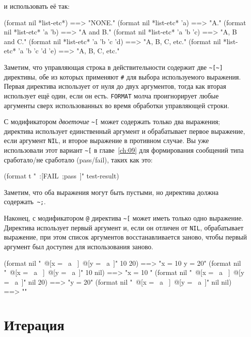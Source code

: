 \noindent{}и использовать её так:

\begin{myverb}
(format nil *list-etc*)                ==> "NONE."
(format nil *list-etc* 'a)             ==> "A."
(format nil *list-etc* 'a 'b)          ==> "A and B."
(format nil *list-etc* 'a 'b 'c)       ==> "A, B and C."
(format nil *list-etc* 'a 'b 'c 'd)    ==> "A, B, C, etc."
(format nil *list-etc* 'a 'b 'c 'd 'e) ==> "A, B, C, etc."
\end{myverb}

Заметим, что управляющая строка в действительности содержит две \lstinline!~[~]!
директивы, обе из которых применяют \lstinline!#! для выбора используемого
выражения. Первая директива использует от нуля до двух аргументов, тогда как вторая
использует ещё один, если он есть. \lstinline{FORMAT} молча проигнорирует любые аргументы
сверх использованных во время обработки управляющей строки.

С модификатором \textit{двоеточие} \lstinline!~[! может содержать только два выражения;
директива использует единственный аргумент и обрабатывает первое выражение, если аргумент
\lstinline{NIL}, и второе выражение в противном случае. Вы уже использовали этот вариант
\lstinline!~[! в главе~\ref{ch:09} для формирования сообщений типа сработало/не сработало
(pass/fail), таких как это:

\begin{myverb}
(format t "~:[FAIL~;pass~]" test-result)
\end{myverb}

Заметим, что оба выражения могут быть пустыми, но директива должна содержать~\lstinline!~;!.

Наконец, с модификатором \lstinline!@! директива \lstinline!~[! может иметь только одно
выражение. Директива использует первый аргумент и, если он отличен от \lstinline{NIL},
обрабатывает выражение, при этом список аргументов восстанавливается заново, чтобы первый
аргумент был доступен для использования заново.

\begin{myverb}
(format nil "~@[x = ~a ~]~@[y = ~a~]" 10 20)   ==> "x = 10 y = 20"
(format nil "~@[x = ~a ~]~@[y = ~a~]" 10 nil)  ==> "x = 10 "
(format nil "~@[x = ~a ~]~@[y = ~a~]" nil 20)  ==> "y = 20"
(format nil "~@[x = ~a ~]~@[y = ~a~]" nil nil) ==> ""
\end{myverb}

\section{Итерация}

